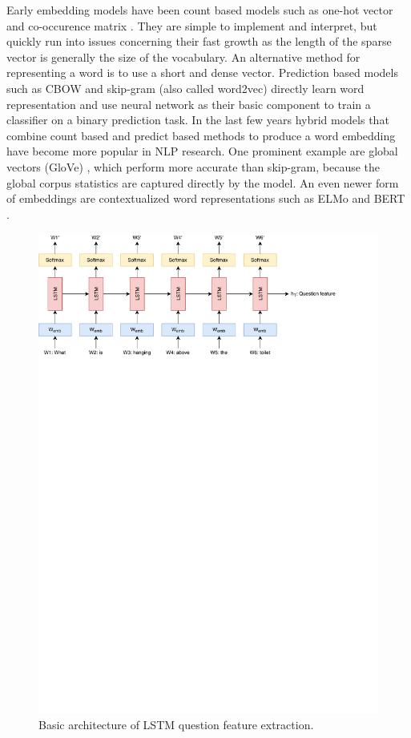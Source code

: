 \documentclass{article}
\begin{document}
Early embedding models have been count based models such as one-hot vector %
and co-occurence matrix \citep{miller1991contextual}. They are simple to implement and interpret, but quickly run into issues concerning their fast growth as the length of the sparse vector is generally the size of the vocabulary. An alternative method for representing a word is to use a short and dense vector. Prediction based models such as CBOW and skip-gram (also called word2vec) \citep{mikolov2013efficient} directly learn word representation and use neural network as their basic component to train a classifier on a binary prediction task. In the last few years hybrid models that combine count based and predict based methods to produce a word embedding have become more popular in NLP research. One prominent example are global vectors (GloVe) \citep{pennington2014glove}, which perform more accurate than skip-gram, because the global corpus statistics are captured directly by the model. An even newer form of embeddings are contextualized word representations such as ELMo \citep{peters2018elmo} and BERT \citep{devlin-etal-2019-bert}.

\begin{figure}[H]
	\centering
	\includegraphics[width=\linewidth]{lstm.pdf}
	\caption{Basic architecture of LSTM question feature extraction.}
	\label{fig:lstm}
\end{figure}
\end{document}
